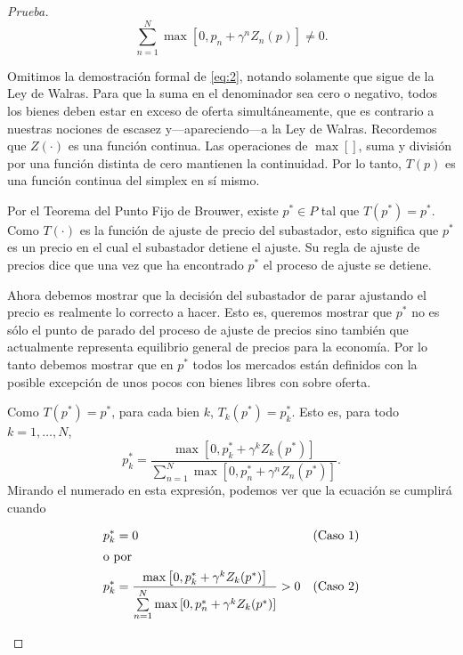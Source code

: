 \documentclass[10pt,a4paper]{article}
\theoremstyle{definition}
\newcommand{\brouwer}{Teorema del Punto Fijo de Brouwer}
\newcommand{\walrass}{Ley de Walras}
\newcommand{\mmax}[2]{\max\left[#1,#2\right]}
\newcommand{\gzp}[2][]{\gamma^{#2}Z_{#2}(p^{#1})}
\newcommand{\pp}{p^{\ast}}
\begin{document}
\begin{proof}[Prueba]
\begin{equation}\label{eq:2}
\sum_{n=1}^{N}\mmax{0}{p_n+\gzp{n}}\neq0.
\end{equation}

Omitimos la demostración formal de \eqref{eq:2}, notando solamente que sigue de la \walrass. Para que la suma en el denominador sea cero o negativo, todos los bienes deben estar en exceso de oferta simultáneamente, que es contrario a nuestras nociones de escasez y---apareciendo---a la \walrass. Recordemos que $Z(\cdot)$ es una función continua. Las operaciones de $\max\left[\right]$, suma y división por una función distinta de cero mantienen la continuidad. Por lo tanto, $T(p)$ es una función continua del simplex en sí mismo.
\setlength{\parskip}{1em}
\setlength{\parindent}{0pt}

Por el \brouwer, existe $\pp\in P$ tal que $T(\pp)=\pp$. Como $T(\cdot)$ es la función de ajuste de precio del subastador, esto significa que $\pp$ es un precio en el cual el subastador detiene el ajuste. Su regla de ajuste de precios dice que una vez que ha encontrado $\pp$ el proceso de ajuste se detiene.

Ahora debemos mostrar que la decisión del subastador de parar ajustando el precio es realmente lo correcto a hacer. Esto es, queremos mostrar que $\pp$ no es sólo el punto de parado del proceso de ajuste de precios sino también que actualmente representa equilibrio general de precios para la economía. Por lo tanto debemos mostrar que en $\pp$ todos los mercados están definidos con la posible excepción de unos pocos con bienes libres con sobre oferta.

Como $T(\pp)=\pp$, para cada bien $k$, $T_k(\pp)=\pp_k$. Esto es, para todo $k=1,\ldots,N$,
\begin{equation}\label{eq:3}
\pp_k=\frac{\mmax{0}{\pp_k+\gzp[\ast]{k}}}{\sum\limits_{n=1}^{N}\mmax{0}{\pp_n+\gzp[\ast]{n}}}.
\end{equation}
Mirando el numerado en esta expresión, podemos ver que la ecuación se cumplirá cuando

\begin{align}
\pp_k & = 0 	&(\text{Caso 1})\\
\intertext{o por}
\pp_k& = \frac{\mmax{0}{\pp_k+\gzp[\ast]{k}}}{\sum\limits_{n=1}^N\mmax{0}{\pp_n+\gzp[\ast]{k}}}>0		&	(\text{Caso 2})
\end{align}

\begin{enumerate}[label={\bfseries Caso \arabic{enumi}},ref=Caso \arabic{enumi},wide =\parindent,leftmargin=2.5em]


\end{enumerate}
\end{proof}
\end{document}
